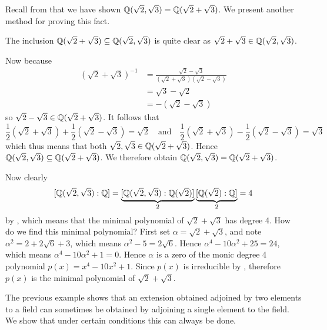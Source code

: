 \begin{example}
    Recall from  that we have shown $\mathbb{Q}(\sqrt2, \sqrt3) = \mathbb{Q}(\sqrt2 + \sqrt3)$. We present another method for proving this fact.

    The inclusion $\mathbb{Q}(\sqrt2 + \sqrt3) \subseteq \mathbb{Q}(\sqrt2, \sqrt3)$ is quite clear as $\sqrt2 + \sqrt3 \in \mathbb{Q}(\sqrt2, \sqrt3)$.

    Now because
    \begin{align*}
        \left(\sqrt2 + \sqrt3\right)^{-1} &= \frac{\sqrt2-\sqrt3}{(\sqrt2+\sqrt3)(\sqrt2-\sqrt3)}\\
        &= \sqrt3-\sqrt2\\
        &= -(\sqrt2 - \sqrt3)
    \end{align*}
    so $\sqrt2 - \sqrt3 \in \mathbb{Q}(\sqrt2 + \sqrt3)$. It follows that
    \[
        \frac12\left(\sqrt2 + \sqrt3\right) + \frac12\left(\sqrt2 - \sqrt3\right) = \sqrt2 \quad\text{and}\quad \frac12\left(\sqrt2 + \sqrt3\right) - \frac12\left(\sqrt2 - \sqrt3\right) = \sqrt3
    \]
    which thus means that both $\sqrt2, \sqrt3 \in \mathbb{Q}(\sqrt2+\sqrt3)$. Hence $\mathbb{Q}(\sqrt2, \sqrt3) \subseteq \mathbb{Q}(\sqrt2 + \sqrt3)$. We therefore obtain $\mathbb{Q}(\sqrt2, \sqrt3) = \mathbb{Q}(\sqrt2+\sqrt3)$.

    Now clearly
    \[
        [\mathbb{Q}(\sqrt2, \sqrt3): \mathbb{Q}] = \underbrace{[\mathbb{Q}(\sqrt2, \sqrt3): \mathbb{Q}(\sqrt2)]}_2\underbrace{[\mathbb{Q}(\sqrt2):\mathbb{Q}]}_2 = 4
    \]
    by , which means that the minimal polynomial of $\sqrt2+\sqrt3$ has degree 4. How do we find this minimal polynomial? First set $\alpha = \sqrt2 + \sqrt3$, and note $\alpha^2 = 2 + 2\sqrt6 + 3$, which means $\alpha^2 - 5 = 2\sqrt6$. Hence $\alpha^4 - 10\alpha^2 + 25 = 24$, which means $\alpha^4 - 10\alpha^2 + 1 = 0$. Hence $\alpha$ is a zero of the monic degree 4 polynomial $p(x) = x^4 - 10x^2 + 1$. Since $p(x)$ is irreducible by , therefore $p(x)$ is the minimal polynomial of $\sqrt2 + \sqrt3$.
\end{example}

The previous example shows that an extension obtained adjoined by two elements to a field can sometimes be obtained by adjoining a single element to the field. We show that under certain conditions this can always be done.

